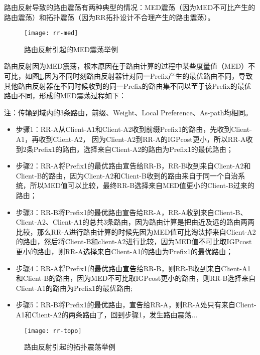 路由反射导致的路由震荡有两种典型的情况：MED震荡（因为MED不可比产生的路由震荡）和拓扑震荡（因为RR拓扑设计不合理产生的路由震荡）。


\begin{figure}
  \centering
  \texttt{[image: rr-med]}
  \caption{路由反射引起的MED震荡举例\cite{Flavel2009Stable}}
  \label{fig:rr-med}
\end{figure}


路由反射因为MED震荡，根本原因在于路由计算的过程中某些度量值（MED）不可比，如图\ref{fig:rr-med},因为不同时刻路由反射器针对同一Prefix产生的最优路由不同，导致其他路由反射器在不同时候收到的同一Prefix的路由集不同以至于该Prefix的最优路由不同，形成的MED震荡过程如下：

注：传输到域内的3条路由，前缀、Weight、Local Preference、As-path均相同。

\begin{itemize}
\item 步骤1：RR-A从Client-A1和Client-A2收到前缀Prefix1的路由，先收到Client-A1，再收到Client-A2， 因为Client-A2到RR-A的IGPcost更小，所以RR-A收到2条Prefix1的路由，选择来自Client-A2的路由为Prefix1的最优路由；
\item 步骤2：RR-A将Prefix1的最优路由宣告给RR-B，RR-B收到来自Client-A2和Client-B的路由，因为Client-A2和Client-B收到的路由来自于同一个自治系统，所以MED值可以比较，最终RR-B选择来自MED值更小的Client-B过来的路由；
\item 步骤3：RR-B将Prefix1的最优路由宣告给RR-A，RR-A收到来自Client-B、Client-A2、Client-A1的总共3条路由，因为路由计算是把由近及远的路由两两比较，那么RR-A进行路由计算的时候先因为MED值可比淘汰掉来自Client-A2的路由，然后将Client-B和client-A2进行比较，因为MED值不可比取IGPcost更小的路由，则RR-A选择来自Client-A1的路由为Prefix1的最优路由；
\item 步骤4：RR-A将Prefix1的最优路由宣告给RR-B，则RR-B收到来自Client-A1和Client-B的路由，因为MED不可比取IGPcost更小的路由，则RR-B选择来自Client-A1的路由为Prefix1的最优路由;
\item 步骤5：RR-B将Prefix1的最优路由，宣告给RR-A，则RR-A处只有来自Client-A1和Client-A2的两条路由了，回到步骤1，发生路由震荡...
\end{itemize}


\begin{figure}
  \centering
  \texttt{[image: rr-topo]}
  \caption{路由反射引起的拓扑震荡举例\cite{ibgp2016infocom}}
  \label{fig:rr-topo}
\end{figure}



